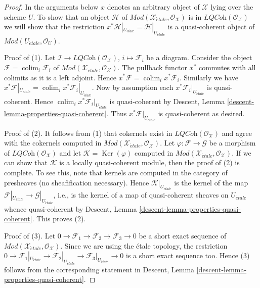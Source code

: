 \documentclass{stacks-project}
\theoremstyle{plain}
\theoremstyle{definition}
\theoremstyle{remark}
\numberwithin{equation}{subsection}
\def\colim{\mathop{\mathrm{colim}}\nolimits}
\def\etale{{\acute{e}tale}}
\def\Ker{\mathop{\mathrm{Ker}}}
\begin{document}
\begin{proof}
In the arguments below $x$ denotes an arbitrary object of $\mathcal{X}$
lying over the scheme $U$. To show that an object $\mathcal{H}$
of $\textit{Mod}(\mathcal{X}_\etale, \mathcal{O}_\mathcal{X})$ is
in $\textit{LQCoh}(\mathcal{O}_\mathcal{X})$ we will show that the
restriction $x^*\mathcal{H}|_{U_\etale} = \mathcal{H}|_{U_\etale}$
is a quasi-coherent object of $\textit{Mod}(U_\etale, \mathcal{O}_U)$.

\medskip\noindent
Proof of (1). Let $\mathcal{I} \to \textit{LQCoh}(\mathcal{O}_\mathcal{X})$,
$i \mapsto \mathcal{F}_i$ be a diagram.
Consider the object $\mathcal{F} = \colim_i \mathcal{F}_i$ of
$\textit{Mod}(\mathcal{X}_\etale, \mathcal{O}_\mathcal{X})$.
The pullback functor $x^*$ commutes with all colimits
as it is a left adjoint. Hence
$x^*\mathcal{F} = \colim_i x^*\mathcal{F}_i$. Similarly we have
$x^*\mathcal{F}|_{U_\etale} =
\colim_i x^*\mathcal{F}_i|_{U_\etale}$.
Now by assumption each $x^*\mathcal{F}_i|_{U_\etale}$
is quasi-coherent. Hence $\colim_i x^*\mathcal{F}_i|_{U_\etale}$
is quasi-coherent by
Descent, Lemma \ref{descent-lemma-properties-quasi-coherent}.
Thus $x^*\mathcal{F}|_{U_\etale}$ is quasi-coherent as desired.

\medskip\noindent
Proof of (2). It follows from (1) that cokernels exist in
$\textit{LQCoh}(\mathcal{O}_\mathcal{X})$ and agree with the cokernels computed
in $\textit{Mod}(\mathcal{X}_\etale, \mathcal{O}_\mathcal{X})$.
Let $\varphi : \mathcal{F} \to \mathcal{G}$ be a morphism of
$\textit{LQCoh}(\mathcal{O}_\mathcal{X})$ and let
$\mathcal{K} = \Ker(\varphi)$ computed in
$\textit{Mod}(\mathcal{X}_\etale, \mathcal{O}_\mathcal{X})$.
If we can show that $\mathcal{K}$ is a locally quasi-coherent module,
then the proof of (2) is complete. To see this, note that kernels
are computed in the category of presheaves (no sheafification necessary).
Hence $\mathcal{K}|_{U_\etale}$ is the kernel of the map
$\mathcal{F}|_{U_\etale} \to \mathcal{G}|_{U_\etale}$,
i.e., is the kernel of a map of quasi-coherent sheaves on $U_\etale$
whence quasi-coherent by
Descent, Lemma \ref{descent-lemma-properties-quasi-coherent}.
This proves (2).

\medskip\noindent
Proof of (3). Let
$0 \to \mathcal{F}_1 \to \mathcal{F}_2 \to \mathcal{F}_3 \to 0$
be a short exact sequence of
$\textit{Mod}(\mathcal{X}_\etale, \mathcal{O}_\mathcal{X})$.
Since we are using the \'etale topology, the restriction
$0 \to \mathcal{F}_1|_{U_\etale} \to
\mathcal{F}_2|_{U_\etale} \to \mathcal{F}_3|_{U_\etale} \to 0$
is a short exact sequence too. Hence (3) follows from the corresponding
statement in
Descent, Lemma \ref{descent-lemma-properties-quasi-coherent}.


\end{proof}
\end{document}
